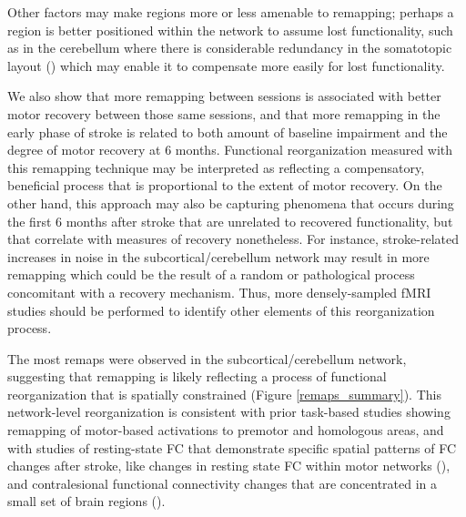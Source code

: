 \documentclass[phd,tocprelim]{cornell}
\begin{document}
     Other factors may make regions more or less amenable to remapping; perhaps a region is better positioned within the network to assume lost functionality, such as in the cerebellum where there is considerable redundancy in the somatotopic layout (\cite{Mottolese2013-sd}) which may enable it to compensate more easily for lost functionality.
    
    We also show that more remapping between sessions is associated with better motor recovery between those same sessions, and that more remapping in the early phase of stroke is related to both amount of baseline impairment and the degree of motor recovery at 6 months. Functional reorganization measured with this remapping technique may be interpreted as reflecting a compensatory, beneficial process that is proportional to the extent of motor recovery. On the other hand, this approach may also be capturing phenomena that occurs during the first 6 months after stroke that are unrelated to recovered functionality, but that correlate with measures of recovery nonetheless. For instance, stroke-related increases in noise in the subcortical/cerebellum network may result in more remapping which could be the result of a random or pathological process concomitant with a recovery mechanism. Thus, more densely-sampled fMRI studies should be performed to identify other elements of this reorganization process. 
        
    The most remaps were observed in the subcortical/cerebellum network, suggesting that remapping is likely reflecting a process of functional reorganization that is spatially constrained (Figure \ref{remaps_summary}). This network-level reorganization is consistent with prior task-based studies showing remapping of motor-based activations to premotor and homologous areas, and with studies of resting-state FC that demonstrate specific spatial patterns of FC changes after stroke, like changes in resting state FC within motor networks (\cite{Zhang2016-vg}), and contralesional functional connectivity changes that are concentrated in a small set of brain regions (\cite{Yourganov2021-hd}).
     
	
\end{document}

